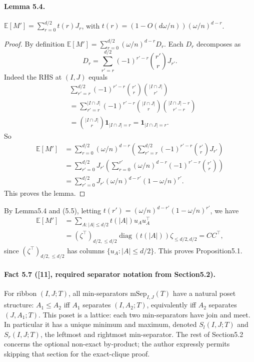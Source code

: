 \paragraph{Lemma 5.4.} $\mathbb E[M']=\sum_{r=0}^{d/2}t(r)J_r$, with $t(r)=(1-O(d\omega/n))(\omega/n)^{d-r}$.
\begin{proof}By definition $\mathbb E[M']=\sum_{r=0}^{d/2}(\omega/n)^{d-r}D_r$. Each $D_r$ decomposes as
\[D_r=\sum_{r'=r}^{d/2}(-1)^{r'-r}\binom{r'}rJ_{r'}.\tag{5.6}\]
Indeed the RHS at $(I,J)$ equals
\begin{align*}&\sum_{r'=r}^{d/2}(-1)^{r'-r}\binom{r'}r\binom{|I\cap J|}{r'}\\&=\sum_{r'=r}^{|I\cap J|}(-1)^{r'-r}\binom{|I\cap J|}r\binom{|I\cap J|-r}{r'-r}\\&=\binom{|I\cap J|}r\mathbf1_{|I\cap J|=r}=\mathbf1_{|I\cap J|=r}.\end{align*}
So
\begin{align*}\mathbb E[M']&=\sum_{r=0}^{d/2}(\omega/n)^{d-r}\left(\sum_{r'=r}^{d/2}(-1)^{r'-r}\binom{r'}rJ_{r'}\right)\\&=\sum_{r'=0}^{d/2}J_{r'}\left(\sum_{r=0}^{r'}(\omega/n)^{d-r}(-1)^{r'-r}\binom{r'}r\right)\\&=\sum_{r'=0}^{d/2}J_{r'}(\omega/n)^{d-r'}(1-\omega/n)^{r'}.\tag{5.7}\end{align*}
This proves the lemma.\end{proof}
By Lemma5.4 and (5.5), letting $t(r')=(\omega/n)^{d-r'}(1-\omega/n)^{r'}$, we have
\begin{align*}\mathbb E[M']&=\sum_{A:|A|\le d/2}t(|A|)u_Au_A^\top\\&=(\zeta^\top)_{d/2,\le d/2}\operatorname{diag}(t(|A|))\zeta_{\le d/2,d/2}=CC^\top,\end{align*}
since $(\zeta^\top)_{d/2,\le d/2}$ has columns $\{u_A:|A|\le d/2\}$. This proves Proposition5.1.
\paragraph{Fact 5.7 ([11], required separator notation from Section5.2).} For ribbon $(I,J;T)$, all min-separators $\mathrm{mSep}_{I,J}(T)$ have a natural poset structure: $A_1\le A_2$ iff $A_1$ separates $(I,A_2;T)$, equivalently iff $A_2$ separates $(J,A_1;T)$. This poset is a lattice: each two min-separators have join and meet. In particular it has a unique minimum and maximum, denoted $S_l(I,J;T)$ and $S_r(I,J;T)$, the leftmost and rightmost min-separator. The rest of Section5.2 concerns the optional non-exact by-product; the author expressly permits skipping that section for the exact-clique proof.
